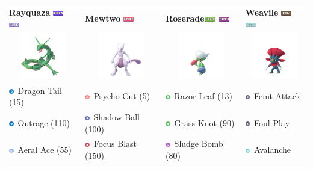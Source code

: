 \documentclass[12pt]{beamer}
\newcommand{\darkfull}{\includegraphics[height=0.2cm]{../../images/type/full/Dark.png}}
\newcommand{\flyingfull}{\includegraphics[height=0.2cm]{../../images/type/full/Flying.png}}
\newcommand{\dragonfull}{\includegraphics[height=0.2cm]{../../images/type/full/Dragon.png}}
\newcommand{\grassfull}{\includegraphics[height=0.2cm]{../../images/type/full/Grass.png}}
\newcommand{\icefull}{\includegraphics[height=0.2cm]{../../images/type/full/Ice.png}}
\newcommand{\psychicfull}{\includegraphics[height=0.2cm]{../../images/type/full/Psychic.png}}
\newcommand{\poisonfull}{\includegraphics[height=0.2cm]{../../images/type/full/Poison.png}}
\newcommand{\fightingsimp}{\includegraphics[height=0.2cm]{../../images/type/simplified/fighting.png}}
\newcommand{\dragonsimp}{\includegraphics[height=0.2cm]{../../images/type/simplified/dragon.png}}
\newcommand{\darksimp}{\includegraphics[height=0.2cm]{../../images/type/simplified/dark.png}}
\newcommand{\ghostsimp}{\includegraphics[height=0.2cm]{../../images/type/simplified/ghost.png}}
\newcommand{\psysimp}{\includegraphics[height=0.2cm]{../../images/type/simplified/psy.png}}
\newcommand{\icesimp}{\includegraphics[height=0.2cm]{../../images/type/simplified/ice.png}}
\newcommand{\grasssimp}{\includegraphics[height=0.2cm]{../../images/type/simplified/grass.png}}
\newcommand{\flyingsimp}{\includegraphics[height=0.2cm]{../../images/type/simplified/flying.png}}
\newcommand{\poisonsimp}{\includegraphics[height=0.2cm]{../../images/type/simplified/poison.png}}
\begin{document}
\begin{frame}
\begin{block}{}
\begin{footnotesize}
\begin{itemize}
\bigskip


\end{itemize}

\begin{center}
\begin{tabular}{p{2.9cm}p{2.9cm}p{2.9cm}p{2.9cm}}
\textbf{Rayquaza} \hfill \dragonfull~\flyingfull & \textbf{Mewtwo} \hfill \psychicfull & \textbf{Roserade}\hfill \grassfull~\poisonfull  & \textbf{Weavile} \hfill \darkfull~\icefull  \\ 
\multicolumn{1}{c}{\includegraphics[width=2cm]{../../images/pokemon/Rayquaza}} & \multicolumn{1}{c}{\includegraphics[width=2cm]{../../images/pokemon/Mewtwo}} & \multicolumn{1}{c}{\includegraphics[width=2cm]{../../images/pokemon/Roserade}} & \multicolumn{1}{c}{\includegraphics[width=2cm]{../../images/pokemon/Weavile}} \\   \hline
\dragonsimp~Dragon Tail (15) & \psysimp~Psycho Cut (5) & \grasssimp~Razor Leaf (13) & \darksimp~Feint Attack \\
\dragonsimp~Outrage (110) & \ghostsimp~Shadow Ball (100) &  \grasssimp~Grass Knot (90) & \darksimp~Foul Play \\
\flyingsimp~Aeral Ace (55) & \fightingsimp~Focus Blast (150) &  \poisonsimp~Sludge Bomb (80) & \icesimp~Avalanche \\ 
\end{tabular}
\end{center}

\end{footnotesize}
\end{block}
\end{frame}
\end{document}
